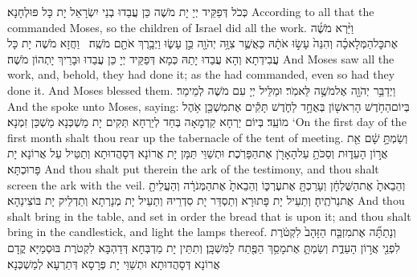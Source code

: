 {כְּכֹל דְּפַקֵּיד יְיָ יָת מֹשֶׁה כֵּן עֲבַדוּ בְנֵי יִשְׂרָאֵל יָת כָּל פּוּלְחָנָא׃}
{According to all that the \lord\space commanded Moses, so the children of Israel did all the work.}{}
{וַיַּ֨רְא מֹשֶׁ֜ה אֶת\maqqaf כׇּל\maqqaf הַמְּלָאכָ֗ה וְהִנֵּה֙ עָשׂ֣וּ אֹתָ֔הּ כַּאֲשֶׁ֛ר צִוָּ֥ה יְהֹוָ֖ה כֵּ֣ן עָשׂ֑וּ וַיְבָ֥רֶךְ אֹתָ֖ם מֹשֶֽׁה׃ \petucha }
{וַחֲזָא מֹשֶׁה יָת כָּל עֲבִידְתָא וְהָא עֲבַדוּ יָתַהּ כְּמָא דְּפַקֵּיד יְיָ כֵּן עֲבַדוּ וּבָרֵיךְ יָתְהוֹן מֹשֶׁה׃}
{And Moses saw all the work, and, behold, they had done it; as the \lord\space had commanded, even so had they done it. And Moses blessed them.}{}
\newperek
{}
{וַיְדַבֵּ֥ר יְהֹוָ֖ה אֶל\maqqaf מֹשֶׁ֥ה לֵּאמֹֽר׃}
{וּמַלֵּיל יְיָ עִם מֹשֶׁה לְמֵימַר׃}
{And the \lord\space spoke unto Moses, saying:}{}
{בְּיוֹם\maqqaf הַחֹ֥דֶשׁ הָרִאשׁ֖וֹן בְּאֶחָ֣ד לַחֹ֑דֶשׁ תָּקִ֕ים אֶת\maqqaf מִשְׁכַּ֖ן אֹ֥הֶל מוֹעֵֽד׃}
{בְּיוֹם יַרְחָא קַדְמָאָה בְּחַד לְיַרְחָא תְּקִים יָת מַשְׁכְּנָא מַשְׁכַּן זִמְנָא׃}
{‘On the first day of the first month shalt thou rear up the tabernacle of the tent of meeting.}{}
{וְשַׂמְתָּ֣ שָׁ֔ם אֵ֖ת אֲר֣וֹן הָעֵד֑וּת וְסַכֹּתָ֥ עַל\maqqaf הָאָרֹ֖ן אֶת\maqqaf הַפָּרֹֽכֶת׃}
{וּתְשַׁוֵּי תַּמָּן יָת אֲרוֹנָא דְּסָהֲדוּתָא וְתַטֵּיל עַל אֲרוֹנָא יָת פָּרוּכְתָּא׃}
{And thou shalt put therein the ark of the testimony, and thou shalt screen the ark with the veil.}{}
{וְהֵבֵאתָ֙ אֶת\maqqaf הַשֻּׁלְחָ֔ן וְעָרַכְתָּ֖ אֶת\maqqaf עֶרְכּ֑וֹ וְהֵבֵאתָ֙ אֶת\maqqaf הַמְּנֹרָ֔ה וְהַעֲלֵיתָ֖ אֶת\maqqaf נֵרֹתֶֽיהָ׃}
{וְתַעֵיל יָת פָּתוּרָא וְתַסְדֵּר יָת סִדְרֵיהּ וְתַעֵיל יָת מְנָרְתָא וְתַדְלֵיק יָת בּוֹצִינַהָא׃}
{And thou shalt bring in the table, and set in order the bread that is upon it; and thou shalt bring in the candlestick, and light the lamps thereof.}{}
{וְנָתַתָּ֞ה אֶת\maqqaf מִזְבַּ֤ח הַזָּהָב֙ לִקְטֹ֔רֶת לִפְנֵ֖י אֲר֣וֹן הָעֵדֻ֑ת וְשַׂמְתָּ֛ אֶת\maqqaf מָסַ֥ךְ הַפֶּ֖תַח לַמִּשְׁכָּֽן׃}
{וְתִתֵּין יָת מַדְבְּחָא דְּדַהְבָּא לִקְטֹרֶת בּוּסְמַיָּא קֳדָם אֲרוֹנָא דְּסָהֲדוּתָא וּתְשַׁוֵּי יָת פְּרָסָא דְּתַרְעָא לְמַשְׁכְּנָא׃}
